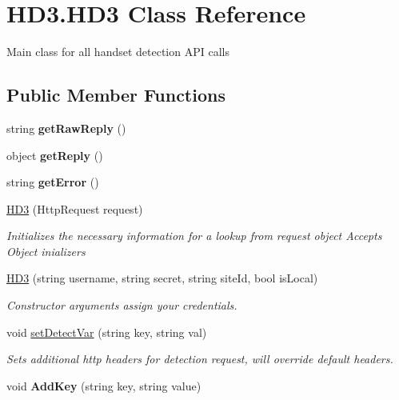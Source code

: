 \hypertarget{class_h_d3_1_1_h_d3}{\section{H\+D3.\+H\+D3 Class Reference}
\label{class_h_d3_1_1_h_d3}
}


Main class for all handset detection A\+P\+I calls  


\subsection*{Public Member Functions}
\begin{DoxyCompactItemize}
\item 
\hypertarget{class_h_d3_1_1_h_d3_a08cdeab81f9bddbfb126a7321ea2fd8c}{string {\bfseries get\+Raw\+Reply} ()}\label{class_h_d3_1_1_h_d3_a08cdeab81f9bddbfb126a7321ea2fd8c}

\item 
\hypertarget{class_h_d3_1_1_h_d3_ad5bc44db014128888296240f6073f485}{object {\bfseries get\+Reply} ()}\label{class_h_d3_1_1_h_d3_ad5bc44db014128888296240f6073f485}

\item 
\hypertarget{class_h_d3_1_1_h_d3_a3dc243815bb91775b05d6fb148959983}{string {\bfseries get\+Error} ()}\label{class_h_d3_1_1_h_d3_a3dc243815bb91775b05d6fb148959983}

\item 
\hyperlink{class_h_d3_1_1_h_d3_a0a238bb9c0e43132312e5c863292c577}{H\+D3} (Http\+Request request)
\begin{DoxyCompactList}\small\item\em Initializes the necessary information for a lookup from request object Accepts Object inializers \end{DoxyCompactList}\item 
\hyperlink{class_h_d3_1_1_h_d3_aab536381ba3fffcd9cf449618b0829dd}{H\+D3} (string username, string secret, string site\+Id, bool is\+Local)
\begin{DoxyCompactList}\small\item\em Constructor arguments assign your credentials. \end{DoxyCompactList}\item 
void \hyperlink{class_h_d3_1_1_h_d3_a658104a63e4bac0a909cdcfed8c2d49b}{set\+Detect\+Var} (string key, string val)
\begin{DoxyCompactList}\small\item\em Sets additional http headers for detection request, will override default headers.\end{DoxyCompactList}\item 
\hypertarget{class_h_d3_1_1_h_d3_a6d161a64b29722a6ed1f16db537cf1d1}{void {\bfseries Add\+Key} (string key, string value)}\label{class_h_d3_1_1_h_d3_a6d161a64b29722a6ed1f16db537cf1d1}


\end{DoxyCompactItemize}
